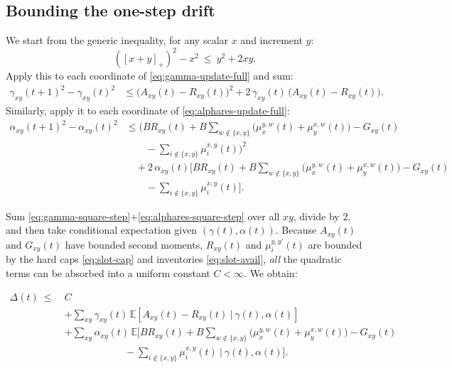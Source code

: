 \documentclass[11pt]{article}
\newcommand{\E}{\mathbb{E}}
\begin{document}
\subsection{Bounding the one-step drift}

We start from the generic inequality, for any scalar $x$ and increment $y$:
\[
([x{+}y]_+)^2 - x^2
\ \le\ y^2 + 2xy.
\]
Apply this to each coordinate of \eqref{eq:gamma-update-full} and sum:
\begin{equation}
\begin{aligned}
\gamma_{xy}(t{+}1)^2 - \gamma_{xy}(t)^2
&\le
\big(A_{xy}(t)-R_{xy}(t)\big)^2
+ 2\,\gamma_{xy}(t)\,\big(A_{xy}(t)-R_{xy}(t)\big).
\end{aligned}
\label{eq:gamma-square-step}
\end{equation}
Similarly, apply it to each coordinate of \eqref{eq:alphares-update-full}:
\begin{equation}
\begin{aligned}
\alpha_{xy}(t{+}1)^2
- \alpha_{xy}(t)^2
&\le
\Big(
B R_{xy}(t)
+ B\sum_{w\notin\{x,y\}}\big(\mu_x^{y,w}(t)+\mu_y^{x,w}(t)\big)
- G_{xy}(t) \\
&\qquad
- \sum_{i\notin\{x,y\}}\mu_i^{x,y}(t)
\Big)^2 \\
&\quad
+ 2\,\alpha_{xy}(t)\Big[
B R_{xy}(t)
+ B\sum_{w\notin\{x,y\}}\big(\mu_x^{y,w}(t)+\mu_y^{x,w}(t)\big)
- G_{xy}(t) \\
&\qquad
- \sum_{i\notin\{x,y\}}\mu_i^{x,y}(t)
\Big].
\end{aligned}
\label{eq:alphares-square-step}
\end{equation}

Sum \eqref{eq:gamma-square-step}+\eqref{eq:alphares-square-step} over all $xy$, divide by $2$, and then take conditional expectation given $(\gamma(t),\alpha(t))$.
Because $A_{xy}(t)$ and $G_{xy}(t)$ have bounded second moments, $R_{xy}(t)$ and $\mu_i^{y,y'}(t)$ are bounded by the hard caps \eqref{eq:slot-cap} and inventories \eqref{eq:slot-avail}, \emph{all} the quadratic terms can be absorbed into a uniform constant $C<\infty$. We obtain:

\begin{equation}
\begin{aligned}
\Delta(t)\ \le\ &
C\\
&+ \sum_{xy} \gamma_{xy}(t)\,
\E\!\left[ A_{xy}(t)-R_{xy}(t)\ \big|\ \gamma(t),\alpha(t)\right] \\
&+ \sum_{xy} \alpha_{xy}(t)\,
\E\!\Big[
B R_{xy}(t)
+ B\sum_{w\notin\{x,y\}}\big(\mu_x^{y,w}(t)+\mu_y^{x,w}(t)\big)
- G_{xy}(t) \\
&\qquad\qquad\qquad
- \sum_{i\notin\{x,y\}}\mu_i^{x,y}(t)
\ \Big|\ \gamma(t),\alpha(t)\Big].
\end{aligned}
\label{eq:drift-before-rearrange}
\end{equation}
\end{document}
